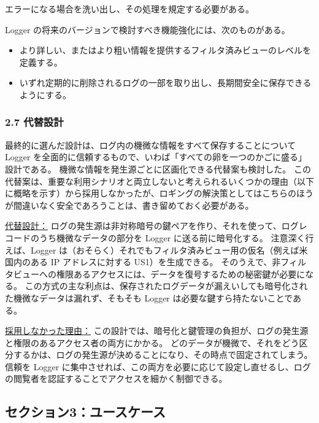 \documentclass[uplatex]{jsarticle}
\begin{document}
エラーになる場合を洗い出し、その処理を規定する必要がある。

Logger の将来のバージョンで検討すべき機能強化には、次のものがある。
\begin{itemize}
\item より詳しい、またはより粗い情報を提供するフィルタ済みビューのレベルを定義する。
\item いずれ定期的に削除されるログの一部を取り出し、長期間安全に保存できるようにする。
\end{itemize}

\subsubsection{2.7 代替設計}

最終的に選んだ設計は、ログ内の機微な情報をすべて保存することについて Logger を全面的に信頼するもので、いわば「すべての卵を一つのかごに盛る」設計である。
機微な情報を発生源ごとに区画化できる代替案も検討した。
この代替案は、重要な利用シナリオと両立しないと考えられるいくつかの理由（以下に概略を示す）から採用しなかったが、ロギングの解決策としてはこちらのほうが間違いなく安全であろうことは、書き留めておく必要がある。

\underline{代替設計：}
ログの発生源は非対称暗号の鍵ペアを作り、それを使って、ログレコードのうち機微なデータの部分を Logger に送る前に暗号化する。
注意深く行えば、Logger は（おそらく）それでもフィルタ済みビュー用の仮名（例えば米国内のある IP アドレスに対する US1）を生成できる。
そのうえで、非フィルタビューへの権限あるアクセスには、データを復号するための秘密鍵が必要になる。
この方式の主な利点は、保存されたログデータが漏えいしても暗号化された機微なデータは漏れず、そもそも Logger は必要な鍵すら持たないことである。

\underline{採用しなかった理由：}
この設計では、暗号化と鍵管理の負担が、ログの発生源と権限のあるアクセス者の両方にかかる。
どのデータが機微で、それをどう区分するかは、ログの発生源が決めることになり、その時点で固定されてしまう。
信頼を Logger に集中させれば、この両方を必要に応じて設定し直せるし、ログの閲覧者を認証することでアクセスを細かく制御できる。

\subsection{セクション3：ユースケース}
\end{document}
